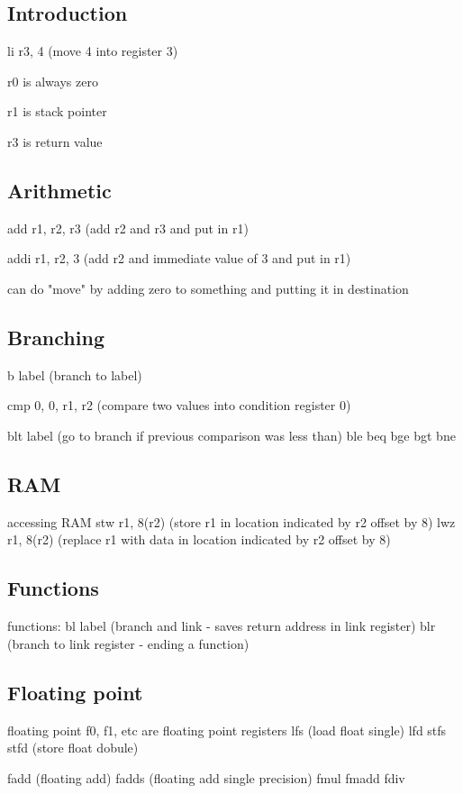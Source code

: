 
\subsection{Introduction}

li r3, 4 (move 4 into register 3)

r0 is always zero

r1 is stack pointer

r3 is return value

\subsection{Arithmetic}
add r1, r2, r3 (add r2 and r3 and put in r1)

addi r1, r2, 3 (add r2 and immediate value of 3 and put in r1)

can do "move" by adding zero to something and putting it in destination

\subsection{Branching}
b label (branch to label)

cmp 0, 0, r1, r2 (compare two values into condition register 0)

blt label (go to branch if previous comparison was less than)
ble
beq
bge
bgt
bne

\subsection{RAM}

accessing RAM
stw r1, 8(r2) (store r1 in location indicated by r2 offset by 8)
lwz r1, 8(r2) (replace r1 with data in location indicated by r2 offset by 8)

\subsection{Functions}

functions:
bl label (branch and link - saves return address in link register)
blr (branch to link register - ending a function)

\subsection{Floating point}
floating point
f0, f1, etc are floating point registers
lfs (load float single)
lfd
stfs
stfd (store float dobule)

fadd (floating add)
fadds (floating add single precision)
fmul
fmadd
fdiv
